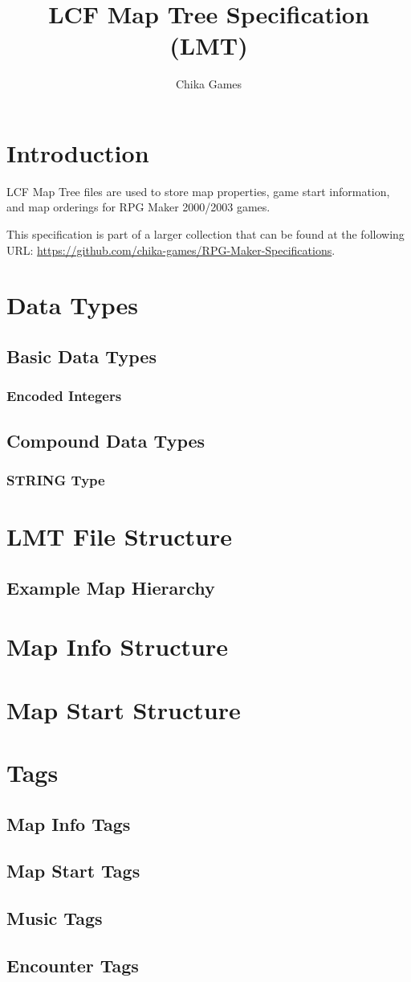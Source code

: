 

\title{LCF Map Tree Specification (LMT)}
\author{Chika Games}


\specpreamble

\section{Introduction}
LCF Map Tree files are used to store map properties, game start information, and map orderings for RPG Maker 2000/2003 games.

This specification is part of a larger collection that can be found at the following URL: \url{https://github.com/chika-games/RPG-Maker-Specifications}.

\section{Data Types}
\subsection{Basic Data Types}
\subsubsection{Encoded Integers}
\subsection{Compound Data Types}
\subsubsection{STRING Type}

\section{LMT File Structure}
\subsection{Example Map Hierarchy}
\section{Map Info Structure}
\section{Map Start Structure}

\section{Tags}
\subsection{Map Info Tags}
\subsection{Map Start Tags}
\subsection{Music Tags}
\subsection{Encounter Tags}


